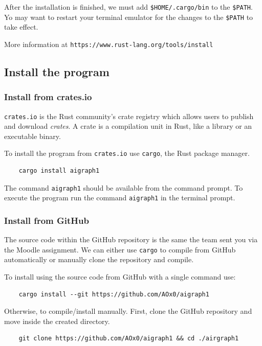 After the installation is finished, we must add \texttt{\$HOME/.cargo/bin} to the \texttt{\$PATH}.
Yo may want to restart your terminal emulator for the changes to the \texttt{\$PATH} to take effect.

More information at \texttt{https://www.rust-lang.org/tools/install}

\subsection{Install the program}

\subsubsection{Install from crates.io}

\texttt{crates.io} is the Rust community’s crate registry which allows users to publish and download \textit{crates}.
A crate is a compilation unit in Rust, like a library or an executable binary.

To install the program from \texttt{crates.io} use \texttt{cargo}, the Rust package manager.

\begin{verbatim}
    cargo install aigraph1
\end{verbatim}

The command \texttt{aigraph1} should be available from the command prompt.
To execute the program run the command \texttt{aigraph1} in the terminal prompt.

\subsubsection{Install from GitHub}

The source code within the GitHub repository is the same the team sent you via the Moodle assignment.
We can either use \texttt{cargo} to compile from GitHub automatically or manually clone the repository and
compile.

To install using the source code from GitHub with a single command use:
\begin{verbatim}
    cargo install --git https://github.com/AOx0/aigraph1
\end{verbatim}

Otherwise, to compile/install manually. First, clone the GitHub repository and move inside the created directory.

\begin{verbatim}
    git clone https://github.com/AOx0/aigraph1 && cd ./airgraph1
\end{verbatim}

